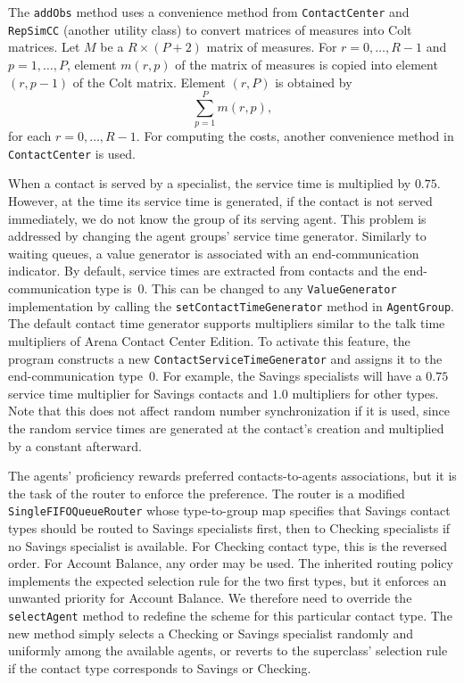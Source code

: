 The \texttt{add\-Obs} method uses a convenience method from
\texttt{Contact\-Center} and \texttt{Rep\-Sim\-CC} (another utility
class)
to convert matrices of measures into Colt
matrices.  Let $M$ be a $R\times (P+2)$ matrix of measures.
For $r=0,\ldots,R-1$ and $p=1,\ldots,P$, element $m(r, p)$
of the matrix of measures is copied into element $(r, p - 1)$ of the
Colt matrix.  Element $(r, P)$ is obtained by
\[\sum_{p=1}^P m(r, p),\]
for each $r=0,\ldots,R-1$.
For computing the costs, another convenience method in
\texttt{Contact\-Center} is used.

When a contact is served by a specialist, the service time is multiplied
by $0.75$.  However, at the time its service time is generated, if the
contact is not served immediately, we do not know the group of its
serving agent.
This problem is addressed by changing the
agent groups' service time generator.  Similarly to waiting queues, a
value generator is associated with an end-communication indicator.
By default, service times are
extracted from contacts and the end-communication type is~0.  This
can be
changed to any \texttt{Value\-Generator} implementation by calling the
\texttt{set\-Contact\-Time\-Generator} method in
\texttt{Agent\-Group}.
The default contact time generator supports multipliers similar to the
talk time multipliers of Arena Contact Center Edition.  To activate
this feature, the program
constructs a new \texttt{Contact\-Service\-Time\-Generator} and
assigns it to the end-communication type~0.
For example, the Savings specialists will
have a $0.75$ service time multiplier for Savings contacts and $1.0$
multipliers for other types.
Note that this does not affect random number synchronization if it is
used, since the random service times are generated at the contact's
creation and multiplied by a constant afterward.

The agents' proficiency rewards preferred contacts-to-agents
associations, but it is the task of the router to enforce the
preference.  The router is a modified
\texttt{Single\-FIFO\-Queue\-Router} whose type-to-group map specifies
that
Savings contact types should be routed to Savings specialists first,
then to Checking specialists if no Savings specialist is
available.   For Checking contact type, this is the reversed order.
For Account Balance, any order may be used.
The inherited routing policy implements the expected selection rule
for the two first types, but it enforces an unwanted priority for
Account Balance.  We therefore need to override the
\texttt{select\-Agent} method to redefine the scheme for this
particular
contact type.  The new method simply selects a Checking or
Savings specialist randomly and uniformly among the available
agents, or reverts to the superclass' selection rule if the contact
type corresponds to Savings or Checking.

